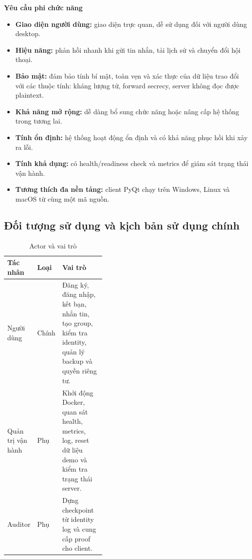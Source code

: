 \textbf{Yêu cầu phi chức năng}

\begin{itemize}
    \item \textbf{Giao diện người dùng:} giao diện trực quan, dễ sử dụng đối với người dùng desktop.

    \item \textbf{Hiệu năng:} phản hồi nhanh khi gửi tin nhắn, tải lịch sử và chuyển đổi hội thoại.

    \item \textbf{Bảo mật:} đảm bảo tính bí mật, toàn vẹn và xác thực của dữ liệu trao đổi với các thuộc tính: kháng lượng tử, forward secrecy, server không đọc được plaintext.

    \item \textbf{Khả năng mở rộng:} dễ dàng bổ sung chức năng hoặc nâng cấp hệ thống trong tương lai.

    \item \textbf{Tính ổn định:} hệ thống hoạt động ổn định và có khả năng phục hồi khi xảy ra lỗi.

    \item \textbf{Tính khả dụng:} có health/readiness check và metrics để giám sát trạng thái vận hành.

    \item \textbf{Tương thích đa nền tảng:} client PyQt chạy trên Windows, Linux và macOS từ cùng một mã nguồn.

\end{itemize}

\subsection{Đối tượng sử dụng và kịch bản sử dụng chính}

\begin{table}[H]
    \centering
    \small
    \begin{tabularx}{\linewidth}{|p{0.22\linewidth}|p{0.18\linewidth}|X|}
        \hline
        \textbf{Tác nhân} & \textbf{Loại} & \textbf{Vai trò} \\
        \hline
        Người dùng & Chính & Đăng ký, đăng nhập, kết bạn, nhắn tin, tạo group, kiểm tra identity, quản lý backup và quyền riêng tư. \\
        \hline
        Quản trị vận hành & Phụ & Khởi động Docker, quan sát health, metrics, log, reset dữ liệu demo và kiểm tra trạng thái server. \\
        \hline
        Auditor & Phụ & Dựng checkpoint từ identity log và cung cấp proof cho client. \\
        \hline
    \end{tabularx}
    \caption{Actor và vai trò}
    \label{tab:actors}
\end{table}

